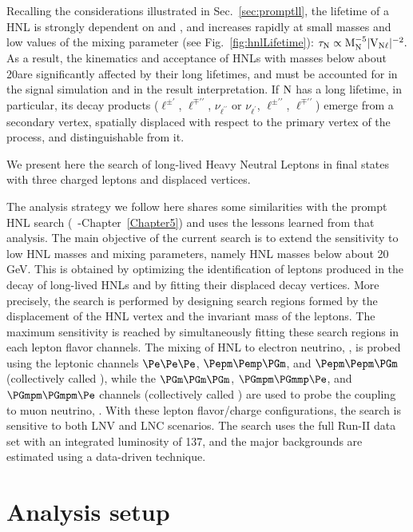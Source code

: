 Recalling the considerations illustrated in Sec.~\ref{sec:promptll}, the lifetime of a HNL is strongly dependent on \mhnl and \mixpar,
and increases rapidly at small masses and low values of the mixing
parameter (see Fig.~\ref{fig:hnlLifetime}):
\(\tau_\mathrm{N}\propto\mathrm{M_{\mathrm{N}}^{-5}|V_{\mathrm{N}\ell}|^{-2}}.\)
As a result, the kinematics and acceptance of HNLs with masses
below about 20\GeV are significantly affected by their long lifetimes,
and must be accounted for in the signal simulation and in the result
interpretation.
If $\mathrm{N}$ has a long lifetime, in particular, its decay products
($\ell^{\pm\prime}$, $\ell^{\mp\prime\prime}$, $\nu_{\ell^{\prime\prime}}$ or
$\nu_{\ell^{\prime}}$, $\ell^{\pm\prime\prime}$, $\ell^{\mp\prime\prime}$)
emerge from a secondary vertex, spatially displaced with respect to
the primary vertex of the process, and distinguishable from it.

We present here the search of long-lived Heavy Neutral Leptons in final states
with three charged leptons and displaced vertices. 

The analysis strategy we follow here shares some similarities with the
prompt HNL search (~\cite{Sirunyan:2018mtv}-Chapter~\ref{Chapter5})
and uses the lessons learned from that
analysis. 
The main objective of the current search is to extend the
sensitivity to low HNL masses and mixing parameters, namely HNL masses
below about 20 GeV. This is obtained by optimizing the identification
of leptons produced in the decay of long-lived HNLs and by fitting
their displaced decay vertices. More precisely, the search is
performed by designing search regions formed by the displacement of
the HNL vertex and the invariant mass of the \displ leptons. The
maximum sensitivity is reached by simultaneously fitting these search
regions in each lepton flavor channels. The mixing of HNL to electron
neutrino, \mixpare, is probed using the leptonic channels 
$\Pe\Pe\Pe$, $\Pepm\Pemp\PGm$, and $\Pepm\Pepm\PGm$ (collectively
called \eex),
while the $\PGm\PGm\PGm$,  $\PGmpm\PGmmp\Pe$, and $\PGmpm\PGmpm\Pe$
channels (collectively called \mmx) are used to probe the coupling to
muon neutrino, \mixparm.
With these lepton flavor/charge configurations, the search is
sensitive to both LNV and LNC scenarios.
The search uses the full Run-II data set with an integrated luminosity
of 137\fbinv, and the major backgrounds are estimated using a
data-driven technique.

\section{Analysis setup}
